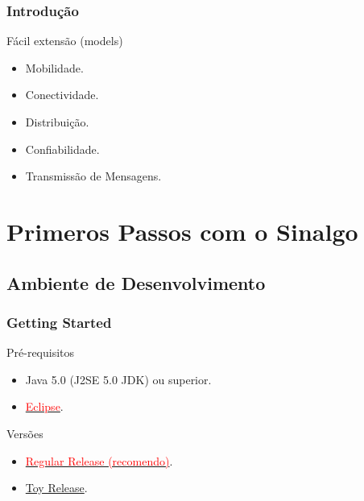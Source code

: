 \documentclass{beamer}
\begin{document}

\begin{frame}\frametitle{Introdução}

\begin{block}{Fácil extensão (models)}
\begin{itemize}
	\item Mobilidade.
	\item Conectividade.
	\item Distribuição.
	\item Confiabilidade.
	\item Transmissão de Mensagens.
\end{itemize}
\end{block}

\end{frame}

\section{Primeros Passos com o Sinalgo} %

\subsection{Ambiente de Desenvolvimento} %

\begin{frame}
\frametitle{Getting Started}
\begin{block}{Pré-requisitos}
\begin{itemize}
	\item Java 5.0 (J2SE 5.0 JDK) ou superior.
	\item \href{https://www.eclipse.org/downloads/}{\textcolor{red}{Eclipse}}.
\end{itemize}
\end{block}

\begin{block}{Versões}
\begin{itemize}
	\item \href{http://sourceforge.net/project/showfiles.php?group_id=192227}{\textcolor{red}{Regular Release (recomendo)}}.
	\item \href{http://sourceforge.net/project/showfiles.php?group_id=192227}{Toy Release}.
\end{itemize}
\end{block}
\end{frame}
\end{document}
